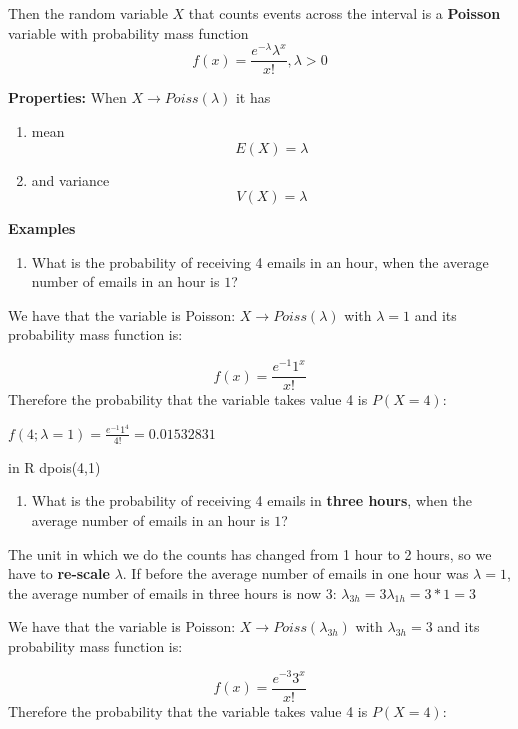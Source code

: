 \documentclass[
]{book}
\providecommand{\tightlist}{%
  \setlength{\itemsep}{0pt}\setlength{\parskip}{0pt}}
\begin{document}
Then the random variable \(X\) that counts events across the interval is a \textbf{Poisson} variable with probability mass function\\
\[f(x)= \frac{e^{-\lambda}\lambda^x}{x!}, \lambda>0\]

\textbf{Properties:}
When \(X \rightarrow Poiss(\lambda)\) it has

\begin{enumerate}
\def\labelenumi{\arabic{enumi})}
\tightlist
\item
  mean \[E(X)= \lambda\]
\item
  and variance \[V(X)= \lambda\]
\end{enumerate}

\textbf{Examples}

\begin{enumerate}
\def\labelenumi{\arabic{enumi})}
\tightlist
\item
  What is the probability of receiving 4 emails in an hour, when the average number of emails in an hour is \(1\)?
\end{enumerate}

We have that the variable is Poisson: \(X \rightarrow Poiss(\lambda)\) with \(\lambda=1\) and its probability mass function is:

\[f(x)= \frac{e^{-1}1^x}{x!}\]
Therefore the probability that the variable takes value 4 is \(P(X=4)\):

\(f(4; \lambda=1)= \frac{e^{-1}1^4}{4!}=0.01532831\)

in R dpois(4,1)

\begin{enumerate}
\def\labelenumi{\arabic{enumi})}
\setcounter{enumi}{1}
\tightlist
\item
  What is the probability of receiving 4 emails in \textbf{three hours}, when the average number of emails in an hour is \(1\)?
\end{enumerate}

The unit in which we do the counts has changed from 1 hour to 2 hours, so we have to \textbf{re-scale} \(\lambda\). If before the average number of emails in one hour was \(\lambda=1\), the average number of emails in three hours is now 3: \(\lambda_{3h}=3\lambda_{1h}=3*1=3\)

We have that the variable is Poisson: \(X \rightarrow Poiss(\lambda_{3h})\) with \(\lambda_{3h}=3\) and its probability mass function is:

\[f(x)= \frac{e^{-3}3^x}{x!}\]
Therefore the probability that the variable takes value 4 is \(P(X=4)\):
\end{document}
